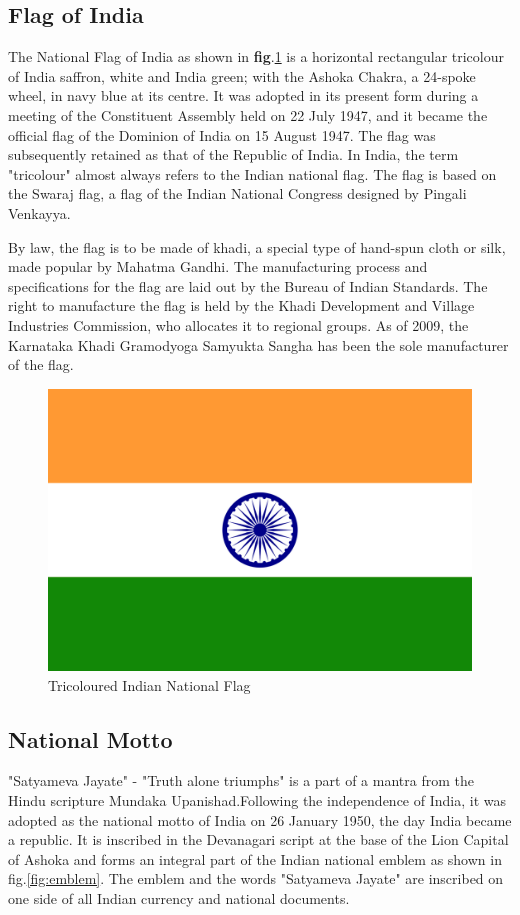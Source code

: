 \documentclass[12pt,a4paper]{article}
\begin{document}
\subsection{Flag of India}
The National Flag of India as shown in \textbf{fig}.\ref{fig:flag} is a horizontal rectangular tricolour of India saffron, white and India green; with the Ashoka Chakra, a 24-spoke wheel, in navy blue at its centre. It was adopted in its present form during a meeting of the Constituent Assembly held on 22 July 1947, and it became the official flag of the Dominion of India on 15 August 1947. The flag was subsequently retained as that of the Republic of India. In India, the term "tricolour" almost always refers to the Indian national flag. The flag is based on the Swaraj flag, a flag of the Indian National Congress designed by Pingali Venkayya.

By law, the flag is to be made of khadi, a special type of hand-spun cloth or silk, made popular by Mahatma Gandhi. The manufacturing process and specifications for the flag are laid out by the Bureau of Indian Standards. The right to manufacture the flag is held by the Khadi Development and Village Industries Commission, who allocates it to regional groups. As of 2009, the Karnataka Khadi Gramodyoga Samyukta Sangha has been the sole manufacturer of the flag.

\begin{figure}[h]
	\centering
	\includegraphics[width = 0.7\linewidth]{../Images/flag}	
	\caption[National Flag]{Tricoloured Indian National Flag}
	\label{fig:flag}
\end{figure}

\subsection{National Motto}
"Satyameva Jayate" - "Truth alone triumphs" is a part of a mantra from the Hindu scripture Mundaka Upanishad.Following the independence of India, it was adopted as the national motto of India on 26 January 1950, the day India became a republic. It is inscribed in the Devanagari script at the base of the Lion Capital of Ashoka and forms an integral part of the Indian national emblem as shown in fig.\ref{fig:emblem}. The emblem and the words "Satyameva Jayate" are inscribed on one side of all Indian currency and national documents.
\end{document}
